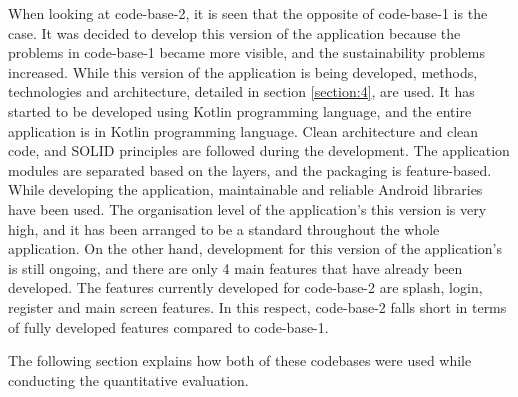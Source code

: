 When looking at code-base-2, it is seen that the opposite of code-base-1 is the case. It was decided to develop this version of the application because the problems in code-base-1 became more visible, and the sustainability problems increased. While this version of the application is being developed, methods, technologies and architecture, detailed in section \ref{section:4}, are used. It has started to be developed using Kotlin programming language, and the entire application is in Kotlin programming language.  Clean architecture and clean code, and SOLID principles are followed during the development. The application modules are separated based on the layers, and the packaging is feature-based. While developing the application, maintainable and reliable Android libraries have been used. The organisation level of the application's this version is very high, and it has been arranged to be a standard throughout the whole application. On the other hand,  development for this version of the application's is still ongoing, and there are only 4 main features that have already been developed. The features currently developed for code-base-2 are splash, login, register and main screen features. In this respect, code-base-2 falls short in terms of fully developed features compared to code-base-1.

The following section explains how both of these codebases were used while conducting the quantitative evaluation.


